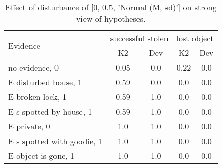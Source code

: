 \begin{table}\begin{tabular}{l|cc|cc}\toprule\multirow{2}{*}{Evidence} & \multicolumn{2}{c}{successful stolen}& \multicolumn{2}{c}{lost object}\\& {K2} & {Dev}& {K2} & {Dev}\\\midrule
no evidence, 0 & \cellcolor{Bittersweet}0.05&\cellcolor{Bittersweet}0.0&\cellcolor{Bittersweet}0.22&\cellcolor{Bittersweet}0.0\\E disturbed house, 1 & \cellcolor{Bittersweet}0.59&\cellcolor{Bittersweet}0.0&\cellcolor{Bittersweet}0.0&\cellcolor{Bittersweet}0.0\\E broken lock, 1 & \cellcolor{Bittersweet}0.59&\cellcolor{Bittersweet}1.0&\cellcolor{Bittersweet}0.0&\cellcolor{Bittersweet}0.0\\E s spotted by house, 1 & \cellcolor{Bittersweet}0.59&\cellcolor{Bittersweet}1.0&\cellcolor{Bittersweet}0.0&\cellcolor{Bittersweet}0.0\\E private, 0 & \cellcolor{Bittersweet}1.0&\cellcolor{Bittersweet}1.0&\cellcolor{Bittersweet}0.0&\cellcolor{Bittersweet}0.0\\E s spotted with goodie, 1 & \cellcolor{Bittersweet}1.0&\cellcolor{Bittersweet}1.0&\cellcolor{Bittersweet}0.0&\cellcolor{Bittersweet}0.0\\E object is gone, 1 & \cellcolor{Bittersweet}1.0&\cellcolor{Bittersweet}1.0&\cellcolor{Bittersweet}0.0&\cellcolor{Bittersweet}0.0\\\bottomrule\end{tabular}\caption{Effect of disturbance of [0, 0.5, 'Normal (M, sd)'] on strong view of hypotheses.}\end{table}